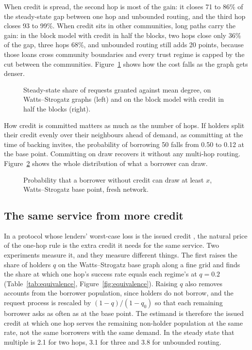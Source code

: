 \documentclass[11pt]{article}
\theoremstyle{plain}
\theoremstyle{definition}
\begin{document}
When credit is spread, the second hop is most of the gain: it closes 71 to 86\% of the steady-state
gap between one hop and unbounded routing, and the third hop closes 93 to 99\%. When credit sits in
other communities, long paths carry the gain: in the block model with credit in half the blocks, two
hops close only 36\% of the gap, three hops 68\%, and unbounded routing still adds 20 points, because
those loans cross community boundaries and every trust regime is capped by the cut between the
communities. Figure~\ref{fig:degree} shows how the cost falls as the graph gets denser.

\begin{figure}[ht]
  \centering
  
  \caption{Steady-state share of requests granted against mean degree, on Watts--Strogatz graphs
  (left) and on the block model with credit in half the blocks (right).}
  \label{fig:degree}
\end{figure}

How credit is committed matters as much as the number of hops. If holders split their credit evenly
over their neighbours ahead of demand, as committing at the time of backing invites, the probability
of borrowing 50 falls from 0.50 to 0.12 at the base point. Committing on draw recovers it without
any multi-hop routing. Figure~\ref{fig:borrowable} shows the whole distribution of what a borrower
can draw.

\begin{figure}[ht]
  \centering
  
  \caption{Probability that a borrower without credit can draw at least $x$, Watts--Strogatz base
  point, fresh network.}
  \label{fig:borrowable}
\end{figure}

\subsection{The same service from more credit}

In a protocol whose lenders' worst-case loss is the issued credit \citep{conservedcredit2026}, the
natural price of the one-hop rule is the extra credit it needs for the same service. Two experiments
measure it, and they measure different things. The first raises the share of holders $q$ on the
Watts--Strogatz base graph along a fine grid and finds the share at which one hop's success rate
equals each regime's at $q=0.2$ (Table~\ref{tab:equivalence}, Figure~\ref{fig:equivalence}). Raising
$q$ also removes accounts from the borrower population, since holders do not borrow, and the request
process is rescaled by $(1-q)/(1-q_0)$ so that each remaining borrower asks as often as at the base
point. The estimand is therefore the issued credit at which one hop serves the remaining non-holder
population at the same rate, not the same borrowers with the same demand. In the steady state that
multiple is 2.1 for two hops, 3.1 for three and 3.8 for unbounded routing.
\end{document}
